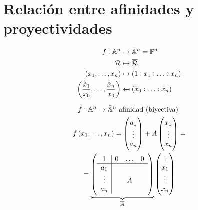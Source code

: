 \section{Relación entre afinidades y proyectividades}
    \begin{minipage}[c]{0,49\textwidth}
        \begin{align*}
                f : \mathbb{A}^n &\to \bar{\mathbb{A}}^n=\mathbb{P}^n \\
                \mathcal{R} &\mapsto \overline{\mathcal{R}} \\
                \left( x_1, \ldots, x_n\right) &\mapsto \left(1:x_1:\ldots:x_n\right)\\
                \left(\frac{\tilde{x}_1}{x_0},\ldots,\frac{\tilde{x}_n}{x_0}\right) &\mapsfrom \left(\tilde{x}_0:\ldots:\tilde{x}_n\right) \\
        \end{align*}
    \end{minipage}
    \vline
    \begin{minipage}[c]{0,49\textwidth}
        \begin{gather*}
            f : \mathbb{A}^n \to \bar{\mathbb{A}}^n  \text{  afinidad (biyectiva) }\\
            f\left( x_1,\ldots,x_n\right) = 
            \begin{pmatrix}
                a_1 \\
                \vdots \\
                a_n \\
            \end{pmatrix}
            +A
            \begin{pmatrix}
                x_1 \\
                \vdots \\
                x_n \\
            \end{pmatrix} = \\ =
            \underbrace{\left(
            \begin{array}{c|ccc}
                1 & 0 & \ldots & 0 \\ \hline
                a_1 & & & \\
                \vdots & & A & \\
                a_n & & & 
            \end{array} \right)}_{\overline{A}}
            \begin{pmatrix}
                1\\
                x_1\\
                \vdots\\
                x_n\\
            \end{pmatrix}
        \end{gather*}
    \end{minipage} \\ \\
